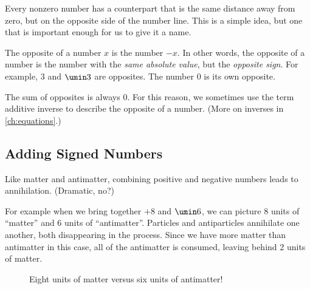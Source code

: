 Every nonzero number has a counterpart that is the same distance away from zero, but on the opposite side of the number line. This is a simple idea, but one that is important enough for us to give it a name.

\begin{boxeddef}[Opposite]
The \gls{opposite} of a number $x$ is the number $-x$. In other words, the opposite of a number is the number with the \textit{same absolute value}, but the \textit{opposite sign}. For example, 3 and $\umin3$ are opposites. The number 0 is its own opposite.

\begin{center}
\end{center}

The sum of opposites is always 0. For this reason, we sometimes use the term \gls{additive inverse} to describe the opposite of a number. (More on inverses in \cref{ch:equations}.)
\end{boxeddef}


\subsection{Adding Signed Numbers}

Like matter and antimatter, combining positive and negative numbers leads to annihilation. (Dramatic, no?)

For example when we bring together $+8$ and $\umin6$, we can picture 8 units of ``matter'' and 6 units of ``antimatter''. Particles and antiparticles annihilate one another, both disappearing in the process. Since we have more matter than antimatter in this case, all of the antimatter is consumed, leaving behind 2 units of matter.

\begin{figure}[!htbp]
\centering
{}
\caption{Eight units of matter versus six units of antimatter!}
\label{fig:intadd}
\end{figure}

